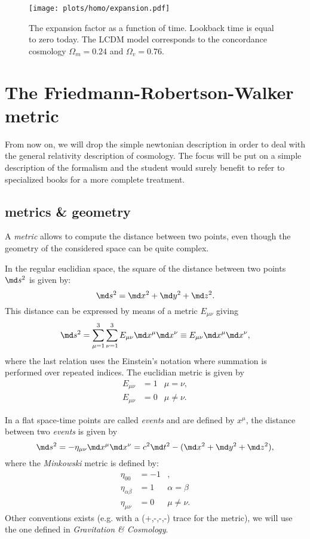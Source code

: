 \begin{figure}[htbp]
	\centering
		\texttt{[image: plots/homo/expansion.pdf]}
	\caption{The expansion factor as a function of time. Lookback time is equal to zero today. The LCDM model corresponds to the concordance cosmology $\Omega_m=0.24$ and $\Omega_v=0.76$.}
	\label{fig:plots_homo_expansion}
\end{figure}%

\section{The Friedmann-Robertson-Walker metric} %
\label{sec:the_friedmann_robertson_walker_metric}
From now on, we will drop the simple newtonian description in order to deal with the general relativity description of cosmology. The focus will be put on a simple description of the formalism and the student would surely benefit to refer to specialized books for a more complete treatment.

\subsection{metrics \& geometry} %
\label{sub:metrics_&_geometry}
A \emph{metric} allows to compute the distance between two points, even though the geometry of the considered space can be quite complex.

In the regular euclidian space, the square of the distance between two points $\md s^2$ is given by:
\begin{equation}
	\md s^2=\md x^2+\md y^2+\md z^2.
\end{equation}
This distance can be expressed by means of a metric $E_{\mu\nu}$ giving
\begin{equation}
	\md s^2=\sum_{\mu=1}^{3}\sum_{\nu=1}^{3}E_{\mu\nu}\md x^\mu\md x^\nu\equiv E_{\mu\nu}\md x^\mu\md x^\nu,
\end{equation}
where the last relation uses the Einstein's notation where summation is performed over repeated indices. The euclidian metric is given by
\begin{eqnarray}
	E_{\mu\nu}&=1&\mu=\nu,\\
	E_{\mu\nu}&=0&\mu\ne\nu.
\end{eqnarray}

In a flat space-time points are called \emph{events} and are defined by $x^\mu$, the distance between two \emph{events} is given by
\begin{equation}
	\md s^2=-\eta_{\mu\nu}\md x^\mu \md x^\nu=c^2\md t^2 -(\md x^2+\md y^2+\md z^2),
\end{equation}
where the \emph{Minkowski} metric is defined by:
\begin{eqnarray}
	\eta_{00}&=-1&,\\
	\eta_{\alpha\beta}&=1&\alpha=\beta\\
	\eta_{\mu\nu}&=0&\mu\ne\nu.
\end{eqnarray}
Other conventions exists (e.g. with a (+,-,-,-) trace for the metric), we will use the one defined in \emph{Gravitation \& Cosmology}. 

